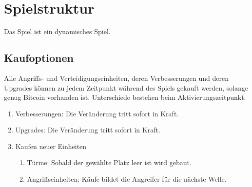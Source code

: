 \section{Spielstruktur}

%
%
%
%

Das Spiel ist ein dynamisches Spiel. 

\subsection{Kaufoptionen}
\label{subsec:kaufoptionen}
    Alle Angriffs- und Verteidigungseinheiten, deren Verbesserungen und deren
    Upgrades können zu jedem Zeitpunkt während des Spiels gekauft werden, 
    solange genug Bitcoin vorhanden ist. Unterschiede bestehen beim 
    Aktivierungszeitpunkt.

	\begin{enumerate}
		\item Verbesserungen: Die Veränderung tritt sofort in Kraft.
		\item Upgrades: Die Veränderung tritt sofort in Kraft.
    		\item Kaufen neuer Einheiten
		\begin{enumerate}
			\item Türme: Sobald der gewählte Platz leer ist wird
				gebaut.
			\item Angriffseinheiten: Käufe bildet die Angreifer 
				für die nächste Welle.
    		\end{enumerate}
	\end{enumerate}

